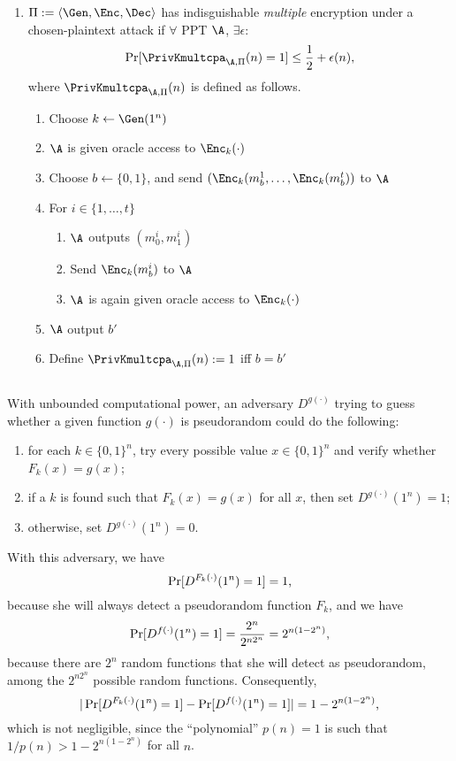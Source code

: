 \begin{solution}
\begin{enumerate}
    \item
      $\Pi := \langle\Gen, \Enc, \Dec\rangle$ has indisguishable \emph{multiple} encryption under a chosen-plaintext attack
      if $\forall$ PPT $\A$, $\exists \epsilon$:
      \[ \Pr[\PrivKmultcpa_{\A,\Pi}(n) = 1] \leq \frac{1}{2} + \epsilon(n), \]
      where $\PrivKmultcpa_{\A,\Pi}(n)$ is defined as follows.
      \begin{enumerate}
        \item Choose $k \leftarrow \Gen(1^n)$
        \item $\A$ is given oracle access to $\Enc_k(\cdot)$
        \item Choose $b \leftarrow \{0,1\}$, and send $(\Enc_k(m_b^1, \ldots, \Enc_k(m_b^t))$ to $\A$
        \item For $i \in \{1, \ldots, t\}$
          \begin{enumerate}
            \item $\A$ outputs $(m_0^i, m_1^i)$
            \item Send $\Enc_k(m_b^i)$ to $\A$
            \item $\A$ is again given oracle access to $\Enc_k(\cdot)$
          \end{enumerate}
        \item $\A$ output $b'$
        \item Define $\PrivKmultcpa_{\A,\Pi}(n) := 1$ iff $b = b'$
      \end{enumerate}
  \end{enumerate}
\end{solution}

\subsection{}
\begin{solution}
  With unbounded computational power, an adversary $D^{g(\cdot)}$ trying to guess whether a given function $g(\cdot)$ is pseudorandom could do the following:
  \begin{enumerate}
    \item for each $k \in \{0,1\}^n$, try every possible value $x \in \{0,1\}^n$ and verify whether $F_k(x) = g(x)$;
    \item if a $k$ is found such that $F_k(x) = g(x)$ for all $x$, then set $D^{g(\cdot)}(1^n) = 1$;
    \item otherwise, set $D^{g(\cdot)}(1^n) = 0$.
  \end{enumerate}
  With this adversary, we have
  \[\Pr[D^{F_k(\cdot)}(1^n) = 1] = 1 \text,\]
  because she will always detect a pseudorandom function $F_k$, and we have
  \[\Pr[D^{f(\cdot)}(1^n) = 1] = \frac{2^n}{2^{n2^n}} = 2^{n(1 - 2^n)}\text,\]
  because there are $2^n$ random functions that she will detect as pseudorandom, among the $2^{n2^n}$ possible random functions.
  Consequently,
  \[|\Pr[D^{F_k(\cdot)}(1^n) = 1] - \Pr[D^{f(\cdot)}(1^n) = 1]| = 1 - 2^{n(1 - 2^n)}\text,\]
  which is not negligible, since the ``polynomial'' $p(n) = 1$ is such that $1/p(n) > 1 - 2^{n(1 - 2^n)}$ for all $n$.
\end{solution}

